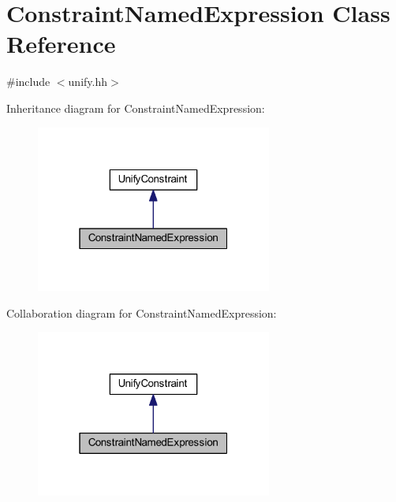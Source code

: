 \hypertarget{class_constraint_named_expression}{}\section{Constraint\+Named\+Expression Class Reference}
\label{class_constraint_named_expression}


{\ttfamily \#include $<$unify.\+hh$>$}



Inheritance diagram for Constraint\+Named\+Expression\+:
\nopagebreak
\begin{figure}[H]
\begin{center}
\leavevmode
\includegraphics[width=220pt]{class_constraint_named_expression__inherit__graph}
\end{center}
\end{figure}


Collaboration diagram for Constraint\+Named\+Expression\+:
\nopagebreak
\begin{figure}[H]
\begin{center}
\leavevmode
\includegraphics[width=220pt]{class_constraint_named_expression__coll__graph}
\end{center}
\end{figure}
